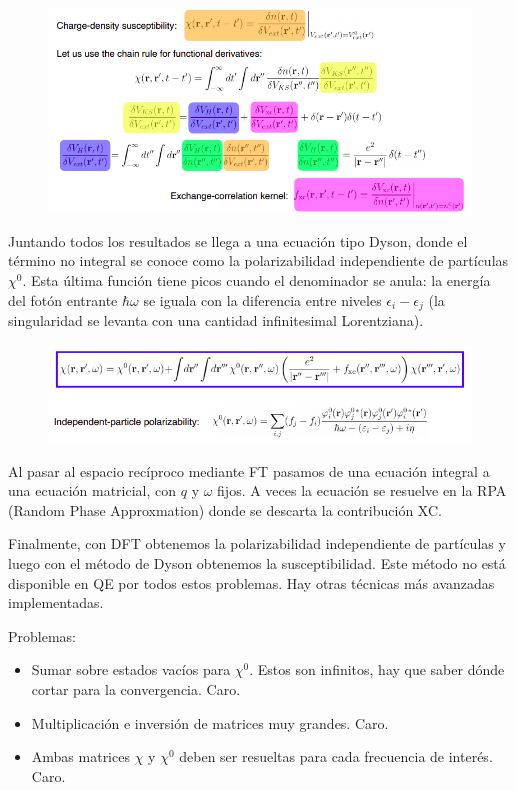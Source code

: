     \begin{figure}[H]
        \centering
        \includegraphics[scale = 0.6]{figs/D6/Dyson_1.png}
    \end{figure}

  Juntando todos los resultados se llega a una ecuación tipo Dyson, donde el término no integral se conoce como la polarizabilidad independiente de partículas $\chi^0$. Esta última función tiene picos cuando el denominador se anula: la energía del fotón entrante $\hbar\omega$ se iguala con la diferencia entre niveles $\epsilon_i - \epsilon_j$ (la singularidad se levanta con una cantidad infinitesimal Lorentziana).

    \begin{figure}[H]
        \centering
        \includegraphics[scale = 0.6]{figs/D6/Dyson_2.png}
    \end{figure}

  Al pasar al espacio recíproco mediante FT pasamos de una ecuación integral a una ecuación matricial, con $q$ y $\omega$ fijos. A veces la ecuación se resuelve en la RPA (Random Phase Approxmation) donde se descarta la contribución XC.

  Finalmente, con DFT obtenemos la polarizabilidad independiente de partículas y luego con el método de Dyson obtenemos la susceptibilidad. Este método no está disponible en QE por todos estos problemas. Hay otras técnicas más avanzadas implementadas.

  Problemas:
    \begin{itemize}
      \item Sumar sobre estados vacíos para $\chi^0$. Estos son infinitos, hay que saber dónde cortar para la convergencia. Caro.
      \item Multiplicación e inversión de matrices muy grandes. Caro.
      \item Ambas matrices $\chi$ y $\chi^0$ deben ser resueltas para cada frecuencia de interés. Caro.
    \end{itemize}

